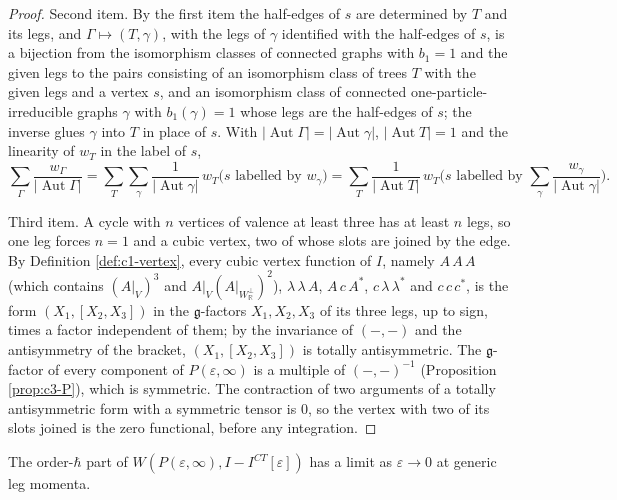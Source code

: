 \begin{proof}
Second item. By the first item the half-edges of $s$ are determined by $T$ and its legs, and $\Gamma\mapsto(T,\gamma)$, with the legs of $\gamma$ identified with the half-edges of $s$, is a bijection from the isomorphism classes of connected graphs with $b_1=1$ and the given legs to the pairs consisting of an isomorphism class of trees $T$ with the given legs and a vertex $s$, and an isomorphism class of connected one-particle-irreducible graphs $\gamma$ with $b_1(\gamma)=1$ whose legs are the half-edges of $s$; the inverse glues $\gamma$ into $T$ in place of $s$. With $|\operatorname{Aut}\Gamma|=|\operatorname{Aut}\gamma|$, $|\operatorname{Aut}T|=1$ and the linearity of $w_T$ in the label of $s$,
\[
\sum_\Gamma\frac{w_\Gamma}{|\operatorname{Aut}\Gamma|}=\sum_T\sum_\gamma\frac{1}{|\operatorname{Aut}\gamma|}\,w_T\big(s\text{ labelled by }w_\gamma\big)=\sum_T\frac{1}{|\operatorname{Aut}T|}\,w_T\Big(s\text{ labelled by }\sum_\gamma\frac{w_\gamma}{|\operatorname{Aut}\gamma|}\Big).
\]

Third item. A cycle with $n$ vertices of valence at least three has at least $n$ legs, so one leg forces $n=1$ and a cubic vertex, two of whose slots are joined by the edge. By Definition \ref{def:c1-vertex}, every cubic vertex function of $I$, namely $A\,A\,A$ (which contains $(A|_V)^3$ and $A|_V(A|_{W_{\mathbb R}^\perp})^2$), $\lambda\,\lambda\,A$, $A\,c\,A^*$, $c\,\lambda\,\lambda^*$ and $c\,c\,c^*$, is the form $(X_1,[X_2,X_3])$ in the $\mathfrak g$-factors $X_1,X_2,X_3$ of its three legs, up to sign, times a factor independent of them; by the invariance of $(-,-)$ and the antisymmetry of the bracket, $(X_1,[X_2,X_3])$ is totally antisymmetric. The $\mathfrak g$-factor of every component of $P(\varepsilon,\infty)$ is a multiple of $(-,-)^{-1}$ (Proposition \ref{prop:c3-P}), which is symmetric. The contraction of two arguments of a totally antisymmetric form with a symmetric tensor is $0$, so the vertex with two of its slots joined is the zero functional, before any integration.
\end{proof}

\begin{proposition}
\label{prop:c4-limit}
The order-$\hbar$ part of $W(P(\varepsilon,\infty),I-I^{CT}[\varepsilon])$ has a limit as $\varepsilon\to0$ at generic leg momenta.
\end{proposition}

